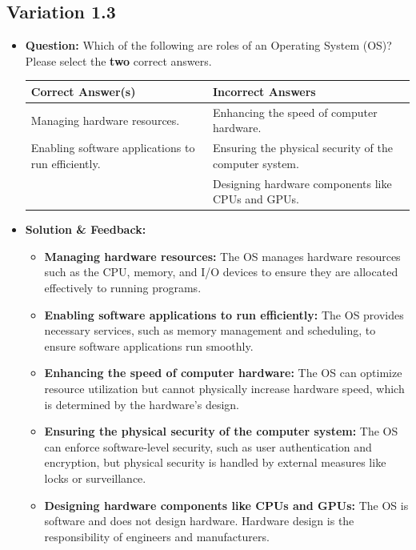 \subsection{Variation 1.3}
\begin{itemize}
    \item \textbf{Question:} Which of the following are roles of an Operating System (OS)? Please select the \textbf{two} correct answers.
    
    \begin{tabularx}{\textwidth}{|X|X|}
        \hline
        \textbf{Correct Answer(s)} & \textbf{Incorrect Answers} \\
        \hline
        Managing hardware resources. & Enhancing the speed of computer hardware. \\
        Enabling software applications to run efficiently. & Ensuring the physical security of the computer system. \\
         & Designing hardware components like CPUs and GPUs. \\
        \hline
    \end{tabularx}
    
    \item \textbf{Solution \& Feedback:}
    \begin{itemize}
        \item \textbf{Managing hardware resources:} The OS manages hardware resources such as the CPU, memory, and I/O devices to ensure they are allocated effectively to running programs.
        \item \textbf{Enabling software applications to run efficiently:} The OS provides necessary services, such as memory management and scheduling, to ensure software applications run smoothly.
        \item \textbf{Enhancing the speed of computer hardware:} The OS can optimize resource utilization but cannot physically increase hardware speed, which is determined by the hardware's design.
        \item \textbf{Ensuring the physical security of the computer system:} The OS can enforce software-level security, such as user authentication and encryption, but physical security is handled by external measures like locks or surveillance.
        \item \textbf{Designing hardware components like CPUs and GPUs:} The OS is software and does not design hardware. Hardware design is the responsibility of engineers and manufacturers.
    \end{itemize}
\end{itemize}

